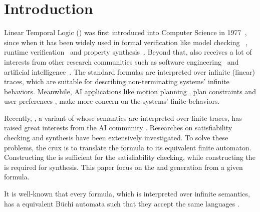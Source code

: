 \section{Introduction}

Linear Temporal Logic (\ltl) was first introduced into Computer Science in 1977~\cite{Pnu77}, since when it has been widely used in formal verification like model checking ~\cite{CGD99}, runtime verification~\cite{BLS11} and property synthesis~\cite{JGWB07,BFJ12}. Beyond that, \ltl also receives a lot of interests from other research communities such as software engineering~\cite{BKMR15} and artificial intelligence~\cite{BK98}. The standard \ltl formulas are interpreted over infinite (linear) traces, which are suitable for describing non-terminating systems' infinite behaviors. Meanwhile, AI applications like motion planning \cite{BK98,DV99,CDV02,PLGG11,CBMM17}, plan constraints \cite{BK00,Gab04} and user preferences \cite{BFM06,BFM11,SBM11}, make more concern on the systems' finite behaviors. 

Recently, \ltlf, a variant of \ltl whose semantics are interpreted over finite traces, has raised great interests from the AI community \cite{GV13,GV15}. Researches on \ltlf satisfiability checking \cite{LZPVH14,LRPZV19} and \ltlf synthesis \cite{GV15} have been extensively investigated. To solve these problems, the crux is to translate the \ltlf formula to its equivalent finite automaton. Constructing the \NFA is sufficient for the satisfiability checking, while constructing the \DFA is required for \ltlf synthesis. This paper focus on the \NFA and \DFA generation from a given \ltlf formula. 

It is well-known that every \ltl formula, which is interpreted over infinite semantics, has a equivalent B\"uchi automata such that they accept the same languages \cite{GPVW95}. 






